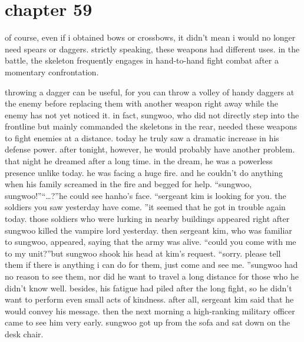 \section{chapter 59}

                            of course, even if i obtained bows or crossbows, it didn’t mean i would no longer need spears or daggers.
 strictly speaking, these weapons had different uses.
 in the battle, the skeleton frequently engages in hand-to-hand fight combat after a momentary confrontation.





throwing a dagger can be useful, for you can throw a volley of handy daggers at the enemy before replacing them with another weapon right away while the enemy has not yet noticed it.
in fact, sungwoo, who did not directly step into the frontline but mainly commanded the skeletons in the rear, needed these weapons to fight enemies at a distance.
today he truly saw a dramatic increase in his defense power.
 after tonight, however, he would probably have another problem.
 that night he dreamed after a long time.
 in the dream, he was a powerless presence unlike today.
 he was facing a huge fire.
 and he couldn’t do anything when his family screamed in the fire and begged for help.
“sungwoo, sungwoo!”“…?”he could see hanho’s face.
“sergeant kim is looking for you.
 the soldiers you saw yesterday have come.
”it seemed that he got in trouble again today.
 those soldiers who were lurking in nearby buildings appeared right after sungwoo killed the vampire lord yesterday.
 then sergeant kim, who was familiar to sungwoo, appeared, saying that the army was alive.
“could you come with me to my unit?”but sungwoo shook his head at kim’s request.
“sorry.
 please tell them if there is anything i can do for them, just come and see me.
”sungwoo had no reason to see them, nor did he want to travel a long distance for those who he didn’t know well.
 besides, his fatigue had piled after the long fight, so he didn’t want to perform even small acts of kindness.
 after all, sergeant kim said that he would convey his message.
 then the next morning a high-ranking military officer came to see him very early.
sungwoo got up from the sofa and sat down on the desk chair.

